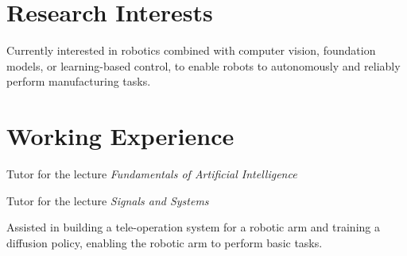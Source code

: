 \documentclass[]{deedy-resume-reversed}
\begin{document}
%
%

%
%

%
%

\begin{minipage}[t]{0.60\textwidth}

\section{Research Interests}
Currently interested in robotics combined with computer vision, foundation models, or learning-based control, to enable robots to autonomously and reliably perform manufacturing tasks.
\sectionsep


\section{Working Experience}


\vspace{0.2em}
Tutor for the lecture \textit{Fundamentals of Artificial Intelligence}

\vspace{0.5em}

\vspace{0.2em}
Tutor for the lecture \textit{Signals and Systems}

\vspace{0.5em}

\vspace{0.2em}
Assisted in building a tele-operation system for a robotic arm and training a diffusion policy, enabling the robotic arm to perform basic tasks.


\end{minipage}
\end{document}
